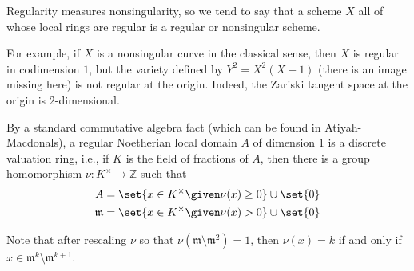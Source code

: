 Regularity measures nonsingularity, so we tend to say that a scheme $X$ all of
whose local rings are regular is a regular or nonsingular scheme.

For example, if $X$ is a nonsingular curve in the classical sense, then $X$ is
regular in codimension $1$, but the variety defined by $Y^2 = X^2(X-1)$ (there is an
image missing here) is not regular at the origin. Indeed, the Zariski tangent space at
the origin is $2$-dimensional.

By a standard commutative algebra fact (which can be found in Atiyah-Macdonals),
a regular Noetherian local domain $A$ of dimension $1$ is a discrete valuation
ring, i.e., if $K$ is the field of fractions of $A$, then there is a group
homomorphism $\nu\colon K^\times \to \mathbb{Z}$ such that
\begin{align*}
	A &= \set{x \in K^\times\given \nu(x)\geq 0} \cup \set{0}\\
	\mathfrak{m} &= \set{x \in K^\times \given \nu(x) > 0} \cup\set{0}
\end{align*}

Note that after rescaling $\nu$ so that $\nu(\mathfrak{m}\setminus \mathfrak{m}^2) = 1$,
then $\nu(x) = k$ if and only if $x \in \mathfrak{m}^k\setminus \mathfrak{m}^{k+1}$.
